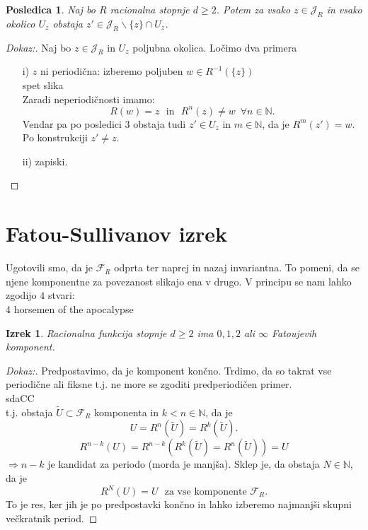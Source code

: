\documentclass{article}
\newtheorem{posledica}{Posledica}
\newtheorem{izrek}{Izrek}
\newcommand{\N}{\mathbb{N}}
\newcommand{\F}{\mathcal{F}}
\begin{document}
\begin{posledica}
Naj bo $R$ racionalna stopnje $d \geq 2$. Potem za vsako $z\in \mathcal{J}_R$
in vsako okolico $U_z$ obstaja $z'\in \mathcal{J}_R \backslash \{z\} \cap U_z$.
\end{posledica}

\begin{proof}[Dokaz:]
Naj bo $z\in \mathcal{J}_R$ in $U_z$ poljubna okolica. Ločimo dva primera 
\begin{enumerate}
    \item[i)] $z$ ni periodična: izberemo poljuben $w \in R^{-1}(\{z\})$\\
    spet slika\\
    Zaradi neperiodičnosti imamo: 
    $$
    R(w) = z \,\, \text{ in } \,\, R^n(z) \neq w \,\,\, \forall n\in \N.
    $$
    Vendar pa po posledici $3$ obstaja tudi $z' \in U_z$ in $m\in \N$, 
    da je $R^m(z') = w$. Po konstrukciji $z' \neq z$.
    \item[ii)] zapiski.
\end{enumerate}
\end{proof}

\section{Fatou-Sullivanov izrek}

Ugotovili smo, da je $\F_R$ odprta ter naprej in nazaj invariantna.
To pomeni, da se njene komponentne za povezanost slikajo ena 
v drugo. V principu se nam lahko zgodijo $4$ stvari:\\
4 horsemen of the apocalypse\\


\begin{izrek}
Racionalna funkcija stopnje $d \geq 2$ ima $0, 1, 2$ ali $\infty$
Fatoujevih komponent.
\end{izrek}

\begin{proof}[Dokaz:]
    Predpostavimo, da je komponent končno. Trdimo, da so takrat 
    vse periodične ali fiksne t.j. ne more se zgoditi predperiodičen primer.\\
    sdaCC\\
    t.j. obstaja $\tilde{U} \subset \F_R$ komponenta in $k < n\in \N$, da je 
    $$
    U = R^n(\tilde{U}) = R^k(\tilde{U}).
    $$
    $$
    R^{n-k}(U) = R^{n-k}(R^k(\tilde{U}) = R^n(\tilde{U})) = U     
    $$
    $\Longrightarrow n-k$ je kandidat za periodo (morda je manjša).
    Sklep je, da obstaja $N\in \N$, da je 
    $$
    R^N(U) = U \,\,\text{ za vse komponente $\F_R$}.
    $$
    To je res, ker jih je po predpostavki končno in lahko izberemo 
    najmanjši skupni večkratnik period.

\end{proof}
\end{document}
